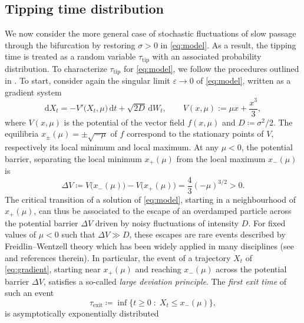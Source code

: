 \documentclass[openacc]{rsproca_new}
\newcommand{\dd}{\mathrm{d}}
\begin{document}
\subsection{Tipping time distribution}\label{subsec:exit}
We now consider the more general case of stochastic fluctuations of slow passage through the bifurcation by restoring $\sigma>0$ in \eqref{eq:model}.
As a result, the tipping time is treated as a random variable $\tau_{\mathrm{tip}}$ with an associated probability distribution. 
To characterize $\tau_{\mathrm{tip}}$ for \eqref{eq:model}, we follow the procedures outlined in \cite{Miller2012,Herbert2017}.
To start, consider again the singular limit $\varepsilon\to0$ of \eqref{eq:model}, written as a gradient system 
%
\begin{equation}\label{eq:gradient}
        \dd X_t=-V'\bigl(X_t,\mu\bigr)\,\dd t+\sqrt{2D}\,\dd W_t,
        \qquad
        V(x,\mu):=\mu x + \frac{x^3}{3},    
\end{equation}
%
where $V(x,\mu)$ is the potential of the vector field $f(x,\mu)$ and $D\coloneqq\sigma^2/2$.
The equilibria $x_{\pm}(\mu)=\pm\sqrt{-\mu}$ of $f$ correspond to the stationary points of $V$, respectively its local minimum and local maximum.
At any $\mu<0$, the potential barrier, separating the local minimum $x_+(\mu)$ from the local maximum $x_-(\mu)$ is
%
\begin{equation}\label{eq:barrier}
        \Delta V\coloneqq V\bigl(x_-(\mu)\bigr)-V\bigl(x_+(\mu)\bigr) = \frac43(-\mu)^{3/2} > 0.
\end{equation}
%
The critical transition of a solution of \eqref{eq:model}, starting in a neighbourhood of $x_+(\mu)$, can thus be associated to the escape of an overdamped particle across the potential barrier $\Delta V$ driven by noisy fluctuations of intensity $D$.
For fixed values of $\mu<0$ such that $\Delta V\gg D$, these escapes are rare events described by Freidlin--Wentzell theory \cite{Freidlin2012} which has been widely applied in many disciplines (see \cite{Santolin2025} and references therein).
In particular, the event of a trajectory $X_t$ of \eqref{eq:gradient}, starting near $x_+(\mu)$ and reaching $x_-(\mu)$ across the potential barrier $\Delta V$, satisfies a so-called \emph{large deviation principle}.
The \emph{first exit time} of such an event \cite[\S~$5.5$]{Gardiner2009}  
%
\begin{equation}\label{eq:first_exit}
        \tau_{\mathrm{exit}} \coloneqq \inf\{t\ge0\;:\;X_t\le x_-(\mu)\}, 
\end{equation}
%
is asymptotically exponentially distributed \cite[Thm.~$2.3$]{Berglund2013}
\end{document}
